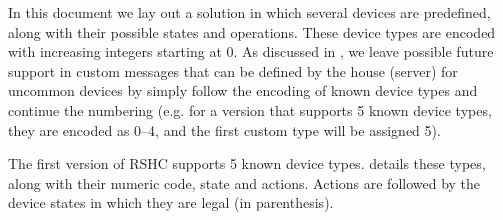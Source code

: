 In this document we lay out a solution in which several devices are predefined, along with their possible states and operations. These device types are encoded with increasing integers starting at 0. As discussed in , we leave possible future support in custom messages that can be defined by the house (server) for uncommon devices by simply follow the encoding of known device types and continue the numbering (e.g. for a version that supports 5 known device types, they are encoded as 0--4, and the first custom type will be assigned 5).

The first version of RSHC supports 5 known device types.  details these types, along with their numeric code, state and actions. Actions are followed by the device states in which they are legal (in parenthesis).

